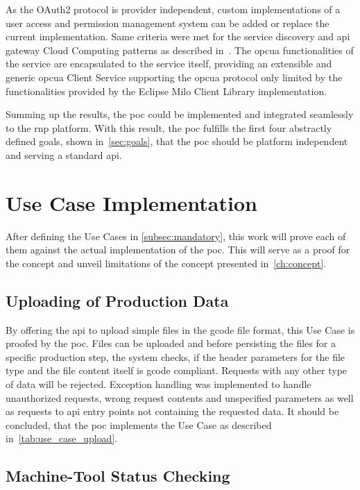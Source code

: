 \documentclass[
a4paper,
twoside,
headsepline,
cleardoublepage=empty,
parskip=half,
draft=false
]{scrbook}
\begin{document}
			As the OAuth2 protocol is provider independent, custom implementations of a user access and permission management system can be added or replace the current implementation. Same criteria were met for the service discovery and \gls{api} gateway Cloud Computing patterns as described in~\cite{leymann2011cloud}.
			The \gls{opcua} functionalities of the service are encapsulated to the service itself, providing an extensible and generic \gls{opcua} Client Service supporting the \gls{opcua} protocol only limited by the functionalities provided by the Eclipse Milo Client Library implementation.

			Summing up the results, the \gls{poc} could be implemented and integrated seamlessly to the \gls{rnp} platform. With this result, the \gls{poc} fulfills the first four abstractly defined goals, shown in~\cref{sec:goals}, that the \gls{poc} should be platform independent and serving a standard \gls{api}.

		\section{Use Case Implementation}\label{sec:use_cases_implementation}

			After defining the Use Cases in \cref{subsec:mandatory}, this work will prove each of them against the actual implementation of the \gls{poc}. This will serve as a proof for the concept and unveil limitations of the concept presented in~\cref{ch:concept}.

			\subsection{Uploading of Production Data}\label{subsec:uploading_g_code}

				By offering the \gls{api} to upload simple files in the \gls{gcode} file format, this Use Case is proofed by the \gls{poc}. Files can be uploaded and before persisting the files for a specific production step, the system checks, if the header parameters for the file type and the file content itself is \gls{gcode} compliant. Requests with any other type of data will be rejected. Exception handling was implemented to handle unauthorized requests, wrong request contents and unspecified parameters as well as requests to \gls{api} entry points not containing the requested data.
				It should be concluded, that the \gls{poc} implements the Use Case as described in~\cref{tab:use_case_upload}.

			\subsection{Machine-Tool Status Checking}\label{subsec:machine_tool_status_checking}
\end{document}
